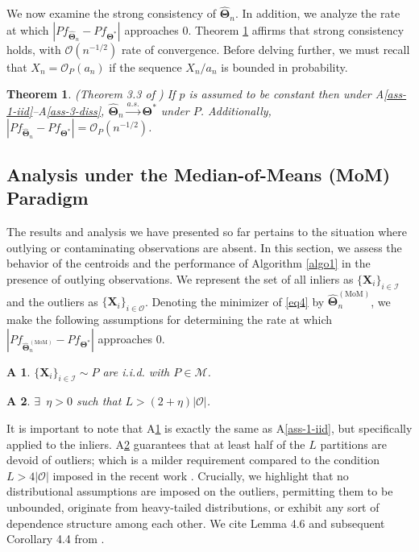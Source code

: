 \documentclass[11pt]{article}
\newcommand{\bX}{\boldsymbol{X}}
\newcommand{\bTheta}{\boldsymbol{\Theta}}
\newcommand{\I}{\mathcal{I}}
\newcommand{\cO}{\mathcal{O}}
\newcommand{\hth}{\widehat{\bTheta}_n}
\newcommand{\tm}{\widehat{\bTheta}_n^{(\text{MoM})}}
\newtheorem{thm}{Theorem}[section]
\newtheorem{assumption}{A\hspace{-4pt}}
\begin{document}
We now examine the strong consistency of $\hth$. In addition, we analyze the rate at which $|P f_{\hth} - P f_{\bTheta^\ast}|$ approaches $0$. Theorem \ref{thm-3-strong-consistency} affirms that strong consistency holds, with $\mathcal{O}(n^{-1/2})$ rate of convergence. Before delving further, we must recall that $X_n = \mathcal{O}_P(a_n)$ if the sequence $X_n/a_n$ is bounded in probability.

\begin{thm}\label{thm-3-strong-consistency}
(Theorem 3.3 of \cite{paul2021uniform}) If $p$ is assumed to be constant then under  A\ref{ass-1-iid}--A\ref{ass-3-diss}, $\hth \xrightarrow{a.s.} \bTheta^\ast$ under $P$. Additionally, $|P f_{\hth} - P f_{\bTheta^\ast}| = \mathcal{O}_P (n^{-1/2})$.
\end{thm}


\subsection{Analysis under the Median-of-Means (MoM) Paradigm}

The results and analysis we have presented so far pertains to the situation where outlying or contaminating observations are absent. In this section, we assess the behavior of the centroids and the performance of Algorithm \ref{algo1} in the presence of outlying observations. %
  We represent the set of all inliers as $\{\bX_i\}_{i \in \I}$ and the outliers as $\{\bX_i\}_{i \in \cO}$. Denoting the  minimizer of \eqref{eq4} by $\tm$, we make the following assumptions for determining the rate at which $|Pf_{\tm} - Pf_{\bTheta^\ast}|$ approaches $0$. %

\begin{assumption}\label{ass-4-iid}
    $\{\bX_i\}_{i \in \I}\sim P$ are i.i.d. with $P \in \mathcal{M}$.
\end{assumption}

\begin{assumption}\label{ass-5-L}
    $\exists$ $\, \eta > 0$ such that $L>(2+\eta)|\cO|$.
\end{assumption}

It is important to note that A\ref{ass-4-iid} is exactly the same as A\ref{ass-1-iid}, but specifically applied to the inliers. A\ref{ass-5-L} guarantees that at least half of the $L$ partitions are devoid of outliers; which is a milder requirement compared to the condition $L > 4|\cO|$ imposed in the recent work \citep{lecue2020robust}. Crucially, we highlight that no distributional assumptions are imposed on the outliers, permitting them to be unbounded, originate from heavy-tailed distributions, or exhibit any sort of dependence structure among each other. We cite Lemma 4.6 and subsequent Corollary 4.4 from \cite{paul2021uniform}.
\end{document}
